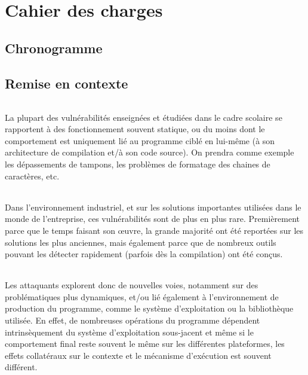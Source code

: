 \chapter{Cahier des charges}
\section*{Chronogramme}
\begin{center}
\end{center}
\section{Remise en contexte}
\subparagraph{}
La plupart des vulnérabilités enseignées et étudiées dans le cadre scolaire
se rapportent à des fonctionnement souvent statique, ou du moins dont le comportement
est uniquement lié au programme ciblé en lui-même (à son architecture de compilation et/à
son code source). On prendra comme exemple les dépassements de tampons, les problèmes de
formatage des chaines de caractères, etc.\subparagraph{}
Dans l'environnement industriel, et sur les solutions importantes utilisées dans le monde
de l'entreprise, ces vulnérabilités sont de plus en plus rare. Premièrement parce que le temps
faisant son œuvre, la grande majorité ont été reportées sur les solutions les plus anciennes,
mais également parce que de nombreux outils pouvant les détecter rapidement (parfois dès la compilation)
ont été conçus.\subparagraph{}
Les attaquants explorent donc de nouvelles voies, notamment sur des problématiques plus dynamiques, et/ou
lié également à l'environnement de production du programme, comme le système d'exploitation ou la bibliothèque utilisée.
En effet, de nombreuses opérations du programme dépendent intrinsèquement du système d'exploitation sous-jacent et
même si le comportement final reste souvent le même sur les différentes plateformes, les effets collatéraux
sur le contexte et le mécanisme d'exécution est souvent différent.\subparagraph{}

